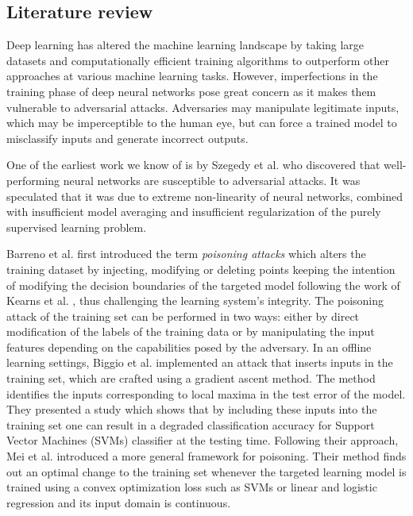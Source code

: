 \subsection{Literature review}
Deep learning has altered the machine learning landscape by taking large datasets and computationally efficient training algorithms to outperform other approaches at various machine learning tasks. However, imperfections in the training phase of deep neural networks pose great concern as it makes them vulnerable to adversarial attacks. Adversaries may manipulate legitimate inputs, which may be imperceptible to the human eye, but can force a trained model to misclassify inputs and generate incorrect outputs.

One of the earliest work we know of is by Szegedy et al. \cite{Szegedy13} who discovered that well-performing neural networks are susceptible to adversarial attacks. It was  speculated that it was due to extreme non-linearity of neural networks, combined with insufficient model averaging and insufficient regularization of the purely supervised learning problem. 

Barreno et al. \cite{BarrenoNSJT06} first introduced the term \emph{poisoning attacks} which alters the training dataset by injecting, modifying or deleting points keeping the intention of modifying the decision boundaries of the targeted model following the work of Kearns et al. \cite{KearnsL93}, thus challenging the learning system's integrity. The poisoning attack of the training set can be performed in two ways: either by direct modification of the labels of the training data or by manipulating the input features depending on the capabilities posed by the adversary. In an offline learning settings, Biggio et al. \cite{BiggioNL12} implemented an attack that inserts inputs in the training set, which are crafted using a gradient ascent method. The method identifies the inputs corresponding to local maxima in the test error of the model. They presented a study which shows that by including these inputs into the training set one can result in a degraded classification accuracy for Support Vector Machines (SVMs) classifier at the testing time. Following their approach, Mei et al. \cite{MeiZ15} introduced a more general framework for poisoning. Their method finds out an optimal change to the training set whenever the targeted learning model is trained using a convex optimization loss such as SVMs or linear and logistic regression and its input domain is continuous.

